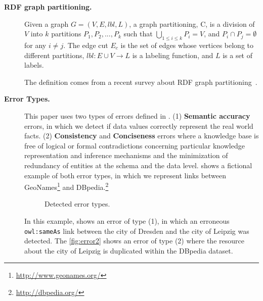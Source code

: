 \begin{description}
\item[\textbf{RDF graph partitioning.}]
Given a graph $G=(V,E, lbl, L)$, a graph partitioning, C, is a division of $V$ into $k$ partitions ${P_1,P_2,...,P_k}$ such that $\bigcup\limits_{1 \leq i \leq k}P_i=V$, and $P_i \cap P_j = \emptyset$ for any $i \neq j$. The edge cut $E_c$ is the set of edges whose vertices belong to different partitions, $lbl : E \cup V \rightarrow L$ is a labeling function, and $L$ is a set of labels. 



The definition comes from a recent survey about RDF graph partitioning~\cite{tomaszuk2015rdf}.

\item[\textbf{Error Types.}]

This paper uses two types of errors defined in \cite{cedal2017}. (1) \textbf{Semantic accuracy} errors, in which we detect if data values correctly represent the real world facts. (2) \textbf{Consistency} and \textbf{Conciseness} errors where a knowledge base is free of logical or formal contradictions concerning particular knowledge representation and inference mechanisms and the minimization of redundancy of entities at the schema and the data level. 
 shows a fictional example of both error types, in which we represent links between  GeoNames\footnote{\url{http://www.geonames.org/}} and DBpedia.\footnote{\url{http://dbpedia.org/}}

\begin{figure}[H]
	\centering
	\caption{Detected error types.}
	\label{fig:errorType}
\end{figure}
%
In this example,  shows an error of type (1), in which an erroneous \texttt{owl:sameAs} link between the city of Dresden and the city of Leipzig was detected. The \cref{fig:error2} shows an error of type (2) where the resource about the city of Leipzig is duplicated within the DBpedia dataset. 


\end{description}

